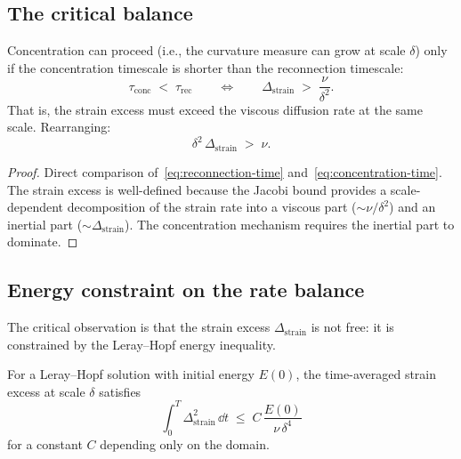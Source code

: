 \subsection{The critical balance}\label{sec:det-balance}

\begin{proposition}\label{prop:rate-balance}
  Concentration can proceed (i.e., the curvature measure can grow at scale $\delta$)
  only if the concentration timescale is shorter than the reconnection timescale:
  \begin{equation}\label{eq:rate-balance}
    \tau_{\mathrm{conc}} \;<\; \tau_{\mathrm{rec}}
    \qquad\Longleftrightarrow\qquad
    \Delta_{\mathrm{strain}} \;>\; \frac{\nu}{\delta^2}.
  \end{equation}
  That is, the strain excess must exceed the viscous diffusion rate at the same scale.
  Rearranging:
  \begin{equation}\label{eq:balance-condition}
    \delta^2\,\Delta_{\mathrm{strain}} \;>\; \nu.
  \end{equation}
\end{proposition}

\begin{proof}
  Direct comparison of~\eqref{eq:reconnection-time}
  and~\eqref{eq:concentration-time}.  The strain excess is well-defined because the
  Jacobi bound provides a scale-dependent decomposition of the strain rate into a
  viscous part ($\sim\nu/\delta^2$) and an inertial part ($\sim\Delta_{\mathrm{strain}}$).
  The concentration mechanism requires the inertial part to dominate.
\end{proof}

\subsection{Energy constraint on the rate balance}\label{sec:det-energy-balance}

The critical observation is that the strain excess $\Delta_{\mathrm{strain}}$ is
not free: it is constrained by the Leray--Hopf energy inequality.

\begin{proposition}\label{prop:energy-strain}
  For a Leray--Hopf solution with initial energy $E(0)$, the time-averaged strain
  excess at scale $\delta$ satisfies
  \begin{equation}\label{eq:strain-energy}
    \int_0^T \Delta_{\mathrm{strain}}^2\,\dd t
    \;\leq\; C\,\frac{E(0)}{\nu\,\delta^4}
  \end{equation}
  for a constant $C$ depending only on the domain.
\end{proposition}

